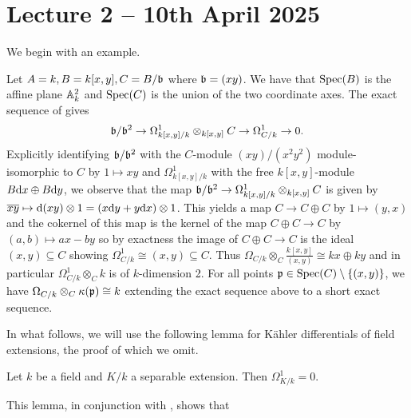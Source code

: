 \section{Lecture 2 -- 10th April 2025}\label{sec: lecture 2}
We begin with an example. 
\begin{example}
    Let $A=k, B=k[x,y], C=B/\mathfrak{b}$ where $\mathfrak{b}=(xy)$. We have that $\operatorname{Spec}(B)$ is the affine plane $\mathbb{A}^{2}_{k}$ and $\operatorname{Spec}(C)$ is the union of the two coordinate axes. The exact sequence of  gives 
    $$\mathfrak{b}/\mathfrak{b}^{2}\to\Omega_{k[x,y]/k}^{1}\otimes_{k[x,y]}C\to\Omega_{C/k}^{1}\to0.$$
    Explicitly identifying $\mathfrak{b}/\mathfrak{b}^{2}$ with the $C$-module $(xy)/(x^{2}y^{2})$ module-isomorphic to $C$ by $1\mapsto xy$ and $\Omega^{1}_{k[x,y]/k}$ with the free $k[x,y]$-module $B\mathrm{d} x\oplus B\mathrm{d} y$, we observe that the map $\mathfrak{b}/\mathfrak{b}^{2}\to\Omega^{1}_{k[x,y]/k}\otimes_{k[x,y]} C$ is given by $\overline{xy}\mapsto\mathrm{d}(xy)\otimes 1=(x\mathrm{d} y+y\mathrm{d} x)\otimes 1$. This yields a map $C\to C\oplus C$ by $1\mapsto (y,x)$ and the cokernel of this map is the kernel of the map $C\oplus C\to C$ by $(a,b)\mapsto ax-by$ so by exactness the image of $C\oplus C\to C$ is the ideal $(x,y)\subseteq C$ showing $\Omega^{1}_{C/k}\cong (x,y)\subseteq C$. Thus $\Omega_{C/k}\otimes_{C}\frac{k[x,y]}{(x,y)}\cong kx\oplus ky$ and in particular $\Omega_{C/k}^{1}\otimes_{C}k$ is of $k$-dimension 2. For all points $\mathfrak{p}\in\operatorname{Spec}(C)\setminus\{(x,y)\}$, we have $\Omega_{C/k}\otimes_{C}\kappa(\mathfrak{p})\cong k$ extending the exact sequence above to a short exact sequence. 
\end{example}
In what follows, we will use the following lemma for K\"{a}hler differentials of field extensions, the proof of which we omit. 
\begin{lemma}\label{lem: differentials of separable extension are zero}
    Let $k$ be a field and $K/k$ a separable extension. Then $\Omega_{K/k}^{1}=0$. 
\end{lemma}
This lemma, in conjunction with , shows that 